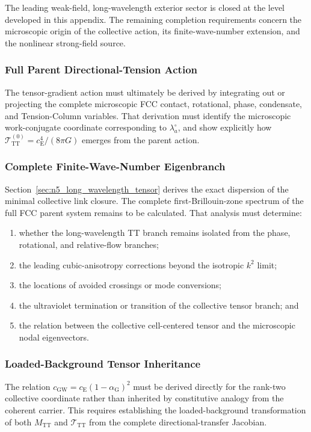 The leading weak-field, long-wavelength exterior sector is closed at the level developed in this appendix. The remaining completion requirements concern the microscopic origin of the collective action, its finite-wave-number extension, and the nonlinear strong-field source.

\subsubsection{Full Parent Directional-Tension Action}
The tensor-gradient action must ultimately be derived by integrating out or projecting the complete microscopic FCC contact, rotational, phase, condensate, and Tension-Column variables. That derivation must identify the microscopic work-conjugate coordinate corresponding to $\lambda_{a}^{\circ}$, and show explicitly how $\mathcal{T}_{\mathrm{TT}}^{(0)} = c_{\mathrm{E}}^{4} / (8\pi G)$ emerges from the parent action.

\subsubsection{Complete Finite-Wave-Number Eigenbranch}
Section~\ref{sec:n5_long_wavelength_tensor} derives the exact dispersion of the minimal collective link closure. The complete first-Brillouin-zone spectrum of the full FCC parent system remains to be calculated. That analysis must determine:
\begin{enumerate}
    \item whether the long-wavelength TT branch remains isolated from the phase, rotational, and relative-flow branches;
    \item the leading cubic-anisotropy corrections beyond the isotropic $k^{2}$ limit;
    \item the locations of avoided crossings or mode conversions;
    \item the ultraviolet termination or transition of the collective tensor branch; and
    \item the relation between the collective cell-centered tensor and the microscopic nodal eigenvectors.
\end{enumerate}

\subsubsection{Loaded-Background Tensor Inheritance}
The relation $c_{\mathrm{GW}} = c_{\mathrm{E}} \left( 1-\alpha_{\mathrm{G}} \right)^{2}$ must be derived directly for the rank-two collective coordinate rather than inherited by constitutive analogy from the coherent carrier. This requires establishing the loaded-background transformation of both $M_{\mathrm{TT}}$ and $\mathcal{T}_{\mathrm{TT}}$ from the complete directional-transfer Jacobian.

